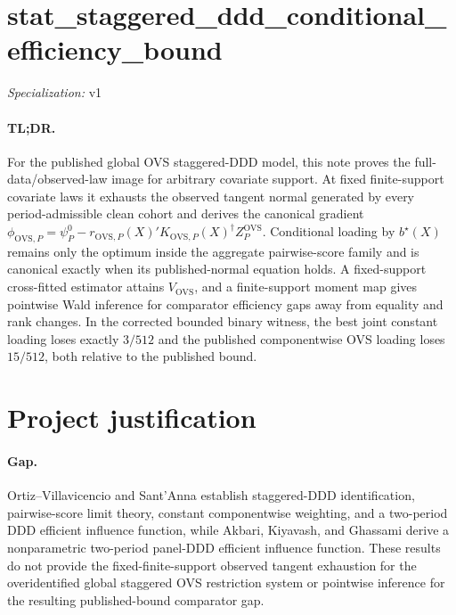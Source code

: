 \documentclass{article}
\begin{document}
\sloppy

\section*{stat\_\allowbreak{}staggered\_\allowbreak{}ddd\_\allowbreak{}conditional\_\allowbreak{}efficiency\_\allowbreak{}bound}

\noindent\textit{Specialization:} v1\par

\paragraph{TL;DR.} For the published global OVS staggered-DDD model, this note proves the full-data/observed-law image for arbitrary covariate support.  At fixed finite-support covariate laws it exhausts the observed tangent normal generated by every period-admissible clean cohort and derives the canonical gradient \(\phi_{\mathrm{OVS},P}=\psi_P^0-r_{\mathrm{OVS},P}(X)'K_{\mathrm{OVS},P}(X)^\dagger Z_P^{\mathrm{OVS}}\).  Conditional loading by \(b^\star(X)\) remains only the optimum inside the aggregate pairwise-score family and is canonical exactly when its published-normal equation holds.  A fixed-support cross-fitted estimator attains \(V_{\mathrm{OVS}}\), and a finite-support moment map gives pointwise Wald inference for comparator efficiency gaps away from equality and rank changes.  In the corrected bounded binary witness, the best joint constant loading loses exactly \(3/512\) and the published componentwise OVS loading loses \(15/512\), both relative to the published bound.

\section{Project justification}

\paragraph{Gap.} Ortiz--Villavicencio and Sant'Anna establish staggered-DDD identification, pairwise-score limit theory, constant componentwise weighting, and a two-period DDD efficient influence function, while Akbari, Kiyavash, and Ghassami derive a nonparametric two-period panel-DDD efficient influence function.  These results do not provide the fixed-finite-support observed tangent exhaustion for the overidentified global staggered OVS restriction system or pointwise inference for the resulting published-bound comparator gap.
\end{document}
